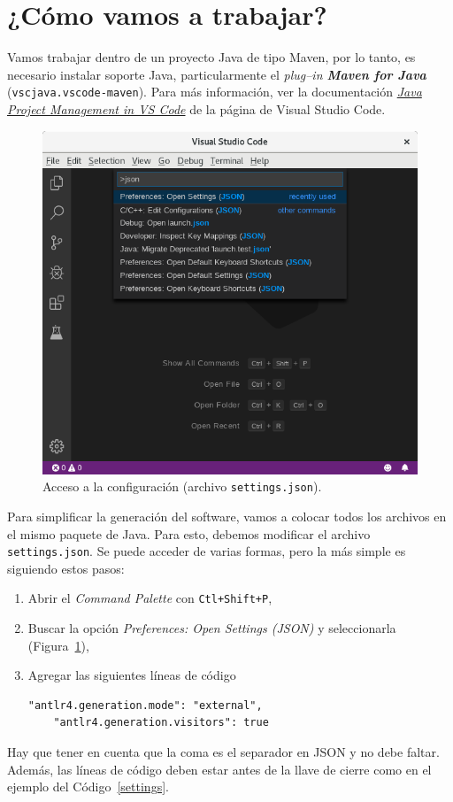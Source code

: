 \documentclass[a5paper,10pt]{article}
\begin{document}
\section{¿Cómo vamos a trabajar?}

Vamos trabajar dentro de un proyecto Java de tipo Maven, por lo tanto, es necesario instalar soporte Java, particularmente el \emph{plug--in \textbf{Maven for Java}} (\verb|vscjava.vscode-maven|).  Para más información, ver la documentación \href{https://code.visualstudio.com/docs/java/java-project}{\emph{Java Project Management in VS Code}} de la página de Visual Studio Code.

\begin{figure}[p]
	\centering
	\includegraphics[width=.85\textwidth]{SelectJSON}
	\caption{Acceso a la configuración (archivo \texttt{settings.json}).}
	\label{preferences}
\end{figure}

Para simplificar la generación del software, vamos a colocar todos los archivos en el mismo paquete de Java.  Para esto, debemos modificar el archivo \verb|settings.json|.  Se puede acceder de varias formas, pero la más simple es siguiendo estos pasos:
\begin{enumerate}
	\item Abrir el \emph{Command Palette} con \verb|Ctl+Shift+P|,
	\item Buscar la opción \emph{Preferences: Open Settings (JSON)} y seleccionarla (Figura~\ref{preferences}),
	\item Agregar las siguientes líneas de código
	\begin{lstlisting}[style=consola]
	"antlr4.generation.mode": "external",
	"antlr4.generation.visitors": true
	\end{lstlisting}
\end{enumerate}
Hay que tener en cuenta que la coma es el separador en JSON y no debe faltar.  Además, las líneas de código deben estar antes de la llave de cierre como en el ejemplo del Código~\ref{settings}.
\end{document}
